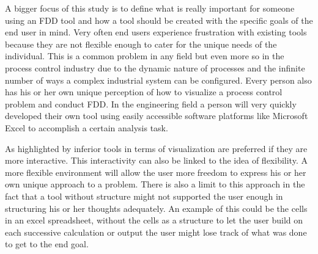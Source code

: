 A bigger focus of this study is to define what is really important for someone using an FDD tool and how a tool should be created with the specific goals of the end user in mind. Very often end users experience frustration with existing tools because they are not flexible enough to cater for the unique needs of the individual. This is a common problem in any field but even more so in the process control industry due to the dynamic nature of processes and the infinite number of ways a complex industrial system can be configured. Every person also has his or her own unique perception of how to visualize a process control problem and conduct FDD. In the engineering field a person will very quickly developed their own tool using easily accessible software platforms like Microsoft Excel to accomplish a certain analysis task.

As highlighted by \cite{saraiya2006insight} inferior tools in terms of visualization are preferred if they are more interactive. This interactivity can also be linked to the idea of flexibility. A more flexible environment will allow the user more freedom to express his or her own unique approach to a problem. There is also a limit to this approach in the fact that a tool without structure might not supported the user enough in structuring his or her thoughts adequately. An example of this could be the cells in an excel spreadsheet, without the cells as a structure to let the user build on each successive calculation or output the user might lose track of what was done to get to the end goal.


